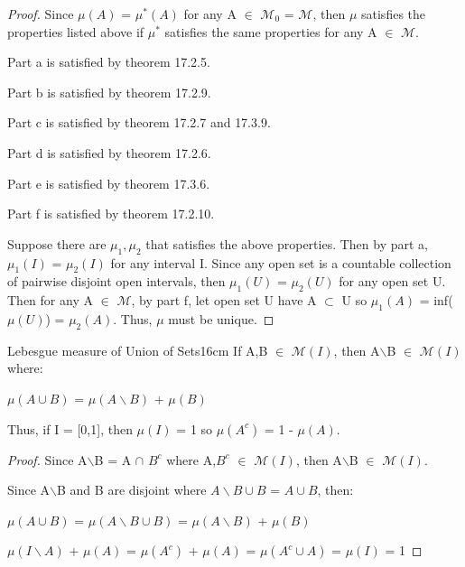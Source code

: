     \begin{proof}
        Since $\mu(A)$ = $\mu^*(A)$ for any
        A $\in$ $\mathcal{M}_0$ = $\mathcal{M}$, then
        $\mu$ satisfies the properties listed above if $\mu^*$
        satisfies the same properties for any A $\in$ $\mathcal{M}$.

        Part a is satisfied by {\color{red} theorem 17.2.5}.

        Part b is satisfied by {\color{red} theorem 17.2.9}.

        Part c is satisfied by {\color{red} theorem 17.2.7}
        and {\color{red} 17.3.9}.

        Part d is satisfied by {\color{red} theorem 17.2.6}.

        Part e is satisfied by {\color{red} theorem 17.3.6}.

        Part f is satisfied by {\color{red} theorem 17.2.10}.

        Suppose there are $\mu_1,\mu_2$ that satisfies the above properties.
        Then by part a, $\mu_1(I)$ = $\mu_2(I)$ for any interval I.
        Since any open set is a countable collection of pairwise disjoint
        open intervals, then $\mu_1(U)$ = $\mu_2(U)$ for any open set U.
        Then for any A $\in$ $\mathcal{M}$, by part f, let open set U have 
        A $\subset$ U so $\mu_1(A)$ = inf($\mu(U)$) = $\mu_2(A)$.
        Thus, $\mu$ must be unique.
    \end{proof}

    \vspace{0.5cm}




    \begin{wtheorem}{Lebesgue measure of Union of Sets}{16cm}
        If A,B $\in$ $\mathcal{M}(I)$, then
        A$\backslash$B $\in$ $\mathcal{M}(I)$ where:

        \hspace{0.5cm}
        $\mu(A \cup B)$
        = $\mu(A \backslash B)$ + $\mu(B)$

        Thus, if I = [0,1], then $\mu(I)$ = 1 so $\mu(A^c)$ = 1 - $\mu(A)$.
    \end{wtheorem}

    \begin{proof}
        Since A$\backslash$B = A $\cap$ $B^c$ where
        A,$B^c$ $\in$ $\mathcal{M}(I)$, then
        A$\backslash$B $\in$ $\mathcal{M}(I)$.

        Since A$\backslash$B and B are disjoint where
        $A \backslash B \cup B$ = $A \cup B$, then:

        \hspace{0.5cm}
        $\mu(A \cup B)$
        = $\mu(A \backslash B \cup B)$
        = $\mu(A \backslash B)$ + $\mu(B)$

        \hspace{0.5cm}
        $\mu(I \backslash A)$ + $\mu(A)$
        = $\mu(A^c)$ + $\mu(A)$
        = $\mu(A^c \cup A)$
        = $\mu(I)$
        = 1
    \end{proof}

